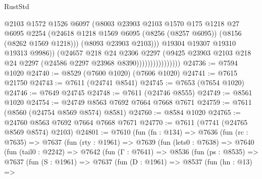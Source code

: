 \begin{lexlean}{RustStd}
\begin{coremodule}
                                    @2103
                                    @1572
                                    @1526
                                    @6097
                                    (@8003
                                      @23903
                                      @2103
                                      @1570
                                      @175
                                      @1218
                                      @27
                                      @6095
                                      @2254
                                      (@24618
                                        @1218
                                        @1569
                                        @6095
                                        (@8256 (@8257 @6095))
                                        (@8156 (@8262 @1569 @1218)))
                                      (@8093 @23903 @2103)))
                                  @19304
                                  @19307
                                  @19310
                                  @19313
                                  @9986))
                              (@24657
                                @218
                                @24
                                @2306
                                @2297
                                (@9425
                                  @23903
                                  @2103
                                  @218
                                  @24
                                  @2297
                                  (@24586 @2297 @23968 @8390))))))))))))))))
@24736 := @7594 @1020
@24740 := @8529 (@7600 @1020) (@7606 @1020)
@24741 := @7615 @21750
@24743 := @7611 (@24741 @8541)
@24745 := @7653 (@7654 @1020)
@24746 := @7649 @24745
@24748 := @7611 (@24746 @8555)
@24749 := @8561 @1020
@24754 := @24749 @8563 @7692 @7664 @7668 @7671
@24759 := @7611 (@8560 (@24754 @8569 @8574) @8581)
@24760 := @8584 @1020
@24765 := @24760 @8563 @7692 @7664 @7668 @7671
@24770 := @7611 (@7741 (@24765 @8569 @8574) @2103)
@24801 := @7610
    (fun (fn : @134) =>
    @7636
      (fun (rc : @7635) =>
      @7637
        (fun (rty : @1961) =>
        @7639
          (fun (lets0 : @7638) =>
          @7640
            (fun (tail0 : @2242) =>
            @7642
              (fun (Γ : @7641) =>
              @8536
                (fun (ps : @8535) =>
                @7637
                  (fun (S : @1961) =>
                  @7637
                    (fun (D : @1961) =>
                    @8537
                      (fun (hn : @13) =>

\end{coremodule}
\end{lexlean}
